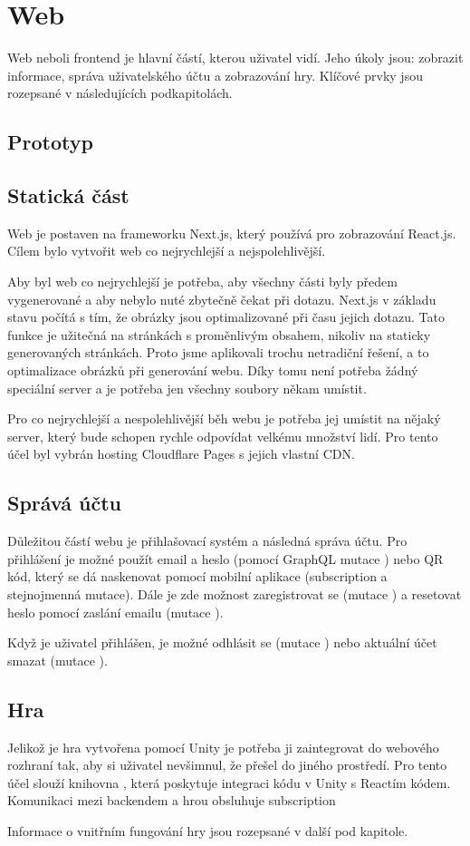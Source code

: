 \section{Web}
Web neboli frontend je hlavní částí, kterou uživatel vidí. Jeho úkoly jsou: zobrazit informace, správa uživatelského účtu a zobrazování hry. Klíčové prvky jsou rozepsané v následujících podkapitolách.

\subsection{Prototyp}

\subsection{Statická část}
Web je postaven na frameworku Next.js, který používá pro zobrazování React.js. Cílem bylo vytvořit web co nejrychlejší a nejspolehlivější.\par
Aby byl web co nejrychlejší je potřeba, aby všechny části byly předem vygenerované a aby nebylo nuté zbytečně čekat při dotazu. Next.js v základu stavu počítá s tím, že obrázky jsou optimalizované při času jejich dotazu. Tato funkce je užitečná na stránkách s proměnlivým obsahem, nikoliv na staticky generovaných stránkách. Proto jsme aplikovali trochu netradiční řešení, a to optimalizace obrázků při generování webu. Díky tomu není potřeba žádný speciální server a je potřeba jen všechny soubory někam umístit.\par
Pro co nejrychlejší a nespolehlivější běh webu je potřeba jej umístit na nějaký server, který bude schopen rychle odpovídat velkému množství lidí. Pro tento účel byl vybrán hosting Cloudflare Pages\cite{Cloudflare-pages} s jejich vlastní CDN\cite{Cloudflare-cdn}. 

\subsection{Správá účtu}
Důležitou částí webu je přihlašovací systém a následná správa účtu. Pro přihlášení je možné použít email a heslo (pomocí GraphQL mutace ) nebo QR kód, který se dá naskenovat pomocí mobilní aplikace (subscription  a stejnojmenná mutace). Dále je zde možnost zaregistrovat se (mutace ) a resetovat heslo pomocí zaslání emailu (mutace ).\par
Když je uživatel přihlášen, je možné odhlásit se (mutace ) nebo aktuální účet smazat (mutace ).

\subsection{Hra}
Jelikož je hra vytvořena pomocí Unity je potřeba ji zaintegrovat do webového rozhraní tak, aby si uživatel nevšimnul, že přešel do jiného prostředí. Pro tento účel slouží knihovna \cite{react-unity-webgl}, která poskytuje integraci kódu v Unity s Reactím kódem. Komunikaci mezi backendem a hrou obsluhuje subscription \par
Informace o vnitřním fungování hry jsou rozepsané v další pod kapitole.
